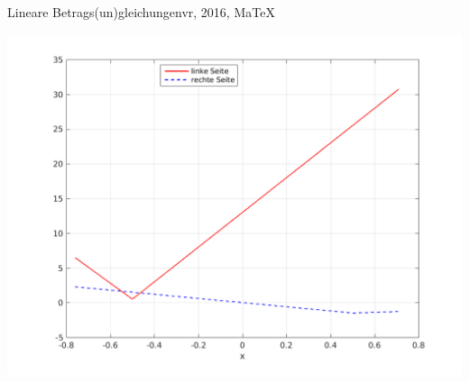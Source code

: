 \begin{MAufgabe}{Lineare Betrags(un)gleichungen}{vr, 2016, MaTeX}
 \begin{center}
 \includegraphics[width=0.8\linewidth]{Abb_zur_Ag_autogenerated_ineq_10.png} \end{center}
 
\else\relax\fi
 \end{MAufgabe}